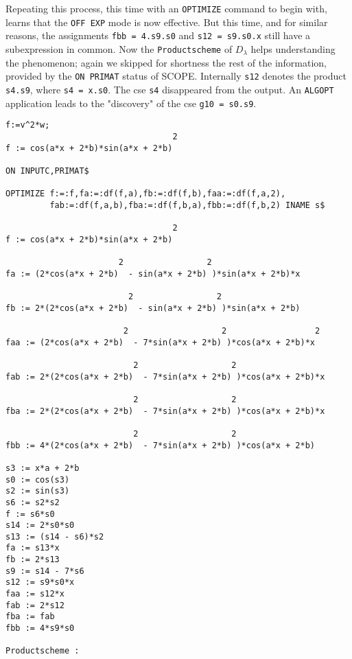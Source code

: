 Repeating this process, this time with an {\tt OPTIMIZE} command to begin with,
learns that the {\tt OFF EXP} mode is now effective. But this time, and for
similar
reasons, the assignments {\tt fbb = 4.s9.s0} and {\tt s12 = s9.s0.x} still
have a subexpression in common. Now the \verb+Productscheme+ of $D_{\lambda}$
helps understanding the phenomenon; again we skipped for shortness the rest of
the information, provided by the {\tt ON PRIMAT} status of SCOPE.
Internally {\tt s12} denotes the product {\tt s4.s9},
where {\tt s4 = x.s0}. The cse {\tt s4} disappeared from the output.
An {\tt ALGOPT} application leads to the "discovery" of the
cse {\tt g10 = s0.s9}.
{\small
\begin{verbatim}
f:=v^2*w;
                                  2
f := cos(a*x + 2*b)*sin(a*x + 2*b)

ON INPUTC,PRIMAT$

OPTIMIZE f:=:f,fa:=:df(f,a),fb:=:df(f,b),faa:=:df(f,a,2),
         fab:=:df(f,a,b),fba:=:df(f,b,a),fbb:=:df(f,b,2) INAME s$

                                  2
f := cos(a*x + 2*b)*sin(a*x + 2*b)

                       2                 2
fa := (2*cos(a*x + 2*b)  - sin(a*x + 2*b) )*sin(a*x + 2*b)*x

                         2                 2
fb := 2*(2*cos(a*x + 2*b)  - sin(a*x + 2*b) )*sin(a*x + 2*b)

                        2                   2                  2
faa := (2*cos(a*x + 2*b)  - 7*sin(a*x + 2*b) )*cos(a*x + 2*b)*x

                          2                   2
fab := 2*(2*cos(a*x + 2*b)  - 7*sin(a*x + 2*b) )*cos(a*x + 2*b)*x

                          2                   2
fba := 2*(2*cos(a*x + 2*b)  - 7*sin(a*x + 2*b) )*cos(a*x + 2*b)*x

                          2                   2
fbb := 4*(2*cos(a*x + 2*b)  - 7*sin(a*x + 2*b) )*cos(a*x + 2*b)

s3 := x*a + 2*b
s0 := cos(s3)
s2 := sin(s3)
s6 := s2*s2
f := s6*s0
s14 := 2*s0*s0
s13 := (s14 - s6)*s2
fa := s13*x
fb := 2*s13
s9 := s14 - 7*s6
s12 := s9*s0*x
faa := s12*x
fab := 2*s12
fba := fab
fbb := 4*s9*s0

Productscheme :


\end{verbatim}}

